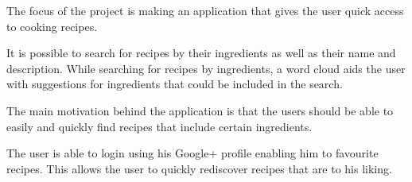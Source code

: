 The focus of the project is making an application that gives the user quick access to cooking recipes.

It is possible to search for recipes by their ingredients as well as their name and description. While searching for recipes by ingredients, a word cloud aids the user with suggestions for ingredients that could be included in the search.

The main motivation behind the application is that the users should be able to easily and quickly find recipes that include certain ingredients.

The user is able to login using his Google+ profile enabling him to favourite recipes. This allows the user to quickly rediscover recipes that are to his liking.